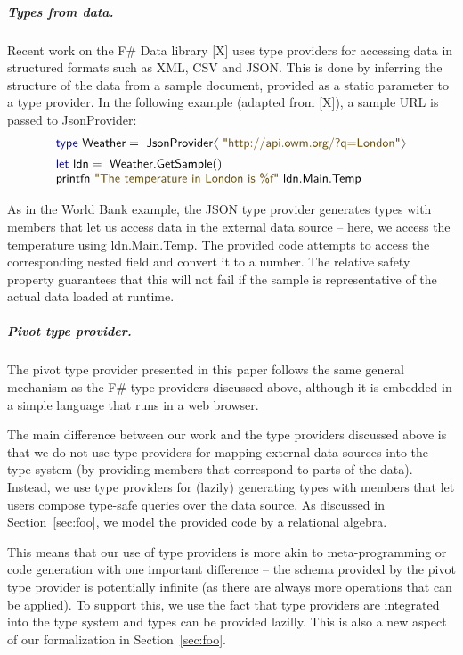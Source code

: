 \documentclass[a4paper,UKenglish]{lipics-v2016}
\newcommand{\langl}{\begin{picture}(4.5,7)
\put(1.1,2.5){\rotatebox{60}{\line(1,0){5.5}}}
\put(1.1,2.5){\rotatebox{300}{\line(1,0){5.5}}}
\end{picture}}
\newcommand{\rangl}{\begin{picture}(4.5,7)
\put(.9,2.5){\rotatebox{120}{\line(1,0){5.5}}}
\put(.9,2.5){\rotatebox{240}{\line(1,0){5.5}}}
\end{picture}}
\newcommand{\str}[1]{\textnormal{\textcolor{strclr}{\sffamily "#1"}}}
\newcommand{\kvd}[1]{\textnormal{\textcolor{kvdclr}{\sffamily #1}}}
\newcommand{\ident}[1]{\textnormal{\sffamily #1}}
\begin{document}
\subparagraph{Types from data.} Recent work on the F\# Data library [X] uses type providers for 
accessing data in structured formats such as XML, CSV and JSON. This is done by inferring the 
structure of the data from a sample document, provided as a static parameter to a type provider.
In the following example (adapted from [X]), a sample URL is passed to \ident{JsonProvider}:
%
\begin{equation*}
\begin{array}{l}
 \kvd{type}~\ident{Weather} = \ident{JsonProvider}\langl\str{http://api.owm.org/?q=London}\rangl \\[0.5em]
 \kvd{let}~\ident{ldn} = \ident{Weather.GetSample}()\\
 \ident{printfn}~\str{The temperature in London is \%f}~\ident{ldn.Main.Temp}
\end{array}
\end{equation*}

\noindent
As in the World Bank example, the JSON type provider generates types with members that let us access
data in the external data source -- here, we access the temperature using \ident{ldn.Main.Temp}. 
The provided code attempts to access the corresponding nested field and convert it to a number.
The relative safety property guarantees that this will not fail if the sample is representative
of the actual data loaded at runtime.
    
\subparagraph{Pivot type provider.} The pivot type provider presented in this paper follows the 
same general mechanism as the F\# type providers discussed above, although it is embedded in a 
simple language that runs in a web browser. 

The main difference between our work and the type providers discussed above is that we do not use
type providers for mapping external data sources into the type system (by providing members that
correspond to parts of the data). Instead, we use type providers for (lazily) generating types 
with members that let users compose type-safe queries over the data source. As discussed in 
Section~\ref{sec:foo}, we model the provided code by a relational algebra.

This means that our use of type providers is more akin to meta-programming or code generation with
one important difference -- the schema provided by the pivot type provider is potentially infinite
(as there are always more operations that can be applied). To support this, we use the fact that
type providers are integrated into the type system and types can be provided lazilly. This is 
also a new aspect of our formalization in Section~\ref{sec:foo}.
\end{document}
